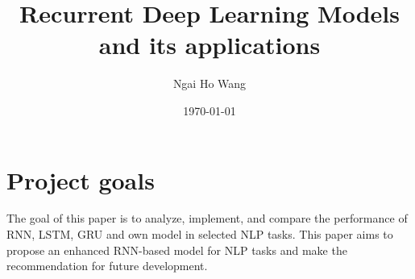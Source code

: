 \documentclass[12pt,a4paper]{article}
\title{Recurrent Deep Learning Models and its applications}
\author{Ngai Ho Wang}
\date{\today}
\begin{document}
\maketitle




\tableofcontents %

\newpage

\section{Project goals}
The goal of this paper is to analyze, implement, and compare the performance of RNN, LSTM, GRU and own model in selected NLP tasks. This paper aims to propose an enhanced RNN-based model for NLP tasks and make the recommendation for future development.


\end{document}
